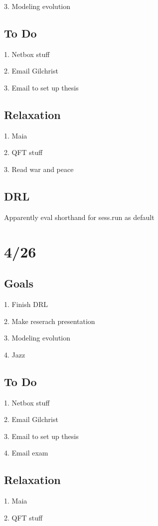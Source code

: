 \documentclass[11pt]{article}
\theoremstyle{remark}
\begin{document}
3. Modeling evolution

\subsection{To Do}

1. Netbox stuff

2. Email Gilchrist

3. Email to set up thesis 

\subsection{Relaxation}

1. Maia

2. QFT stuff

3. Read war and peace

\subsection{DRL}

Apparently eval shorthand for sess.run as default

\section{4/26}

\subsection{Goals}

1. Finish DRL

2. Make reserach presentation

3. Modeling evolution

4. Jazz

\subsection{To Do}

1. Netbox stuff

2. Email Gilchrist

3. Email to set up thesis 

4. Email exam

\subsection{Relaxation}

1. Maia

2. QFT stuff
\end{document}
